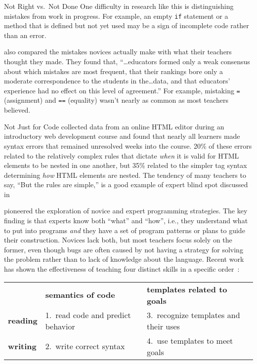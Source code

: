 \begin{aside}{Not Right vs.\ Not Done}
  One difficulty in research like this is distinguishing mistakes from work in progress.
  For example,
  an empty \texttt{if} statement or a method that is defined but not yet used
  may be a sign of incomplete code rather than an error.
\end{aside}

\cite{Brow2017} also compared the mistakes novices actually make
with what their teachers thought they made.
They found that,
``{\ldots}educators formed only a weak consensus about which mistakes are most frequent,
that their rankings bore only a moderate correspondence to the students in the{\ldots}data,
and that educators' experience had no effect on this level of agreement.''
For example,
mistaking \texttt{=} (assignment) and \texttt{==} (equality)
wasn't nearly as common as most teachers believed.

\begin{aside}{Not Just for Code}
  \cite{Park2015} collected data from an online HTML editor during an introductory web development course
  and found that nearly all learners made syntax errors that remained unresolved weeks into the course.
  20\% of these errors related to the relatively complex rules
  that dictate \emph{when} it is valid for HTML elements to be nested in one another,
  but 35\% related to the simpler tag syntax determining \emph{how} HTML elements are nested.
  The tendency of many teachers to say,
  ``But the rules are simple,''
  is a good example of expert blind spot discussed in 
\end{aside}


\cite{Solo1984,Solo1986} pioneered the exploration of novice and expert programming strategies.
The key finding is that experts know both ``what'' and ``how'',
i.e.,
they understand what to put into programs
\emph{and} they have a set of program patterns or plans to guide their construction.
Novices lack both,
but most teachers focus solely on the former,
even though bugs are often caused by not having a strategy for solving the problem
rather than to lack of knowledge about the language.
Recent work has shown the effectiveness of teaching four distinct skills in a specific order~\cite{Xie2019}:

\begin{longtable}{lll}
		        & \textbf{semantics of code}   		& \textbf{templates related to goals} \\
\textbf{reading}	& 1.\ read code and predict behavior	& 3.\ recognize templates and their uses \\
\textbf{writing}	& 2.\ write correct syntax		& 4.\ use templates to meet goals
\end{longtable}

